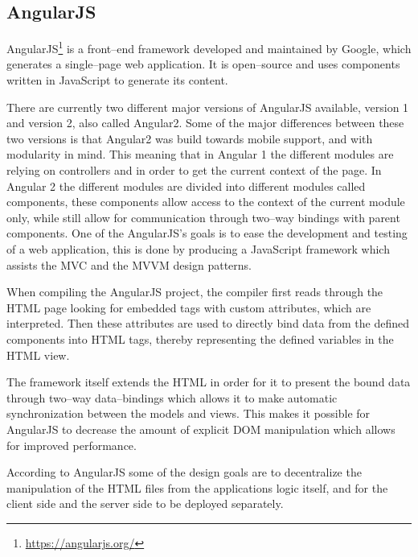 \subsection{AngularJS} \label{ssec:angular}
AngularJS\footnote{\url{https://angularjs.org/}} is a front--end framework developed and maintained by Google, which generates a single--page web application.
It is open--source and uses components written in JavaScript to generate its content.

\bigskip
There are currently two different major versions of AngularJS available, version 1 and version 2, also called Angular2\cite{angular_1_2}.
Some of the major differences between these two versions is that Angular2 was build towards mobile support, and with modularity in mind.
This meaning that in Angular 1 the different modules are relying on controllers and  in order to get the current context of the page.
In Angular 2 the different modules are divided into different modules called components, these components allow access to the context of the current module only, while still allow for communication through two--way bindings with parent components.
One of the AngularJS's goals is to ease the development and testing of a web application, this is done by producing a JavaScript framework which assists the MVC and the MVVM design patterns.

\bigskip
When compiling the AngularJS project, the compiler first reads through the HTML page looking for embedded tags with custom attributes, which are interpreted.
Then these attributes are used to directly bind data from the defined components into HTML tags, thereby representing the defined variables in the HTML view.

The framework itself extends the HTML in order for it to present the bound data through two--way data--bindings which allows it to make automatic synchronization between the models and views.
This makes it possible for AngularJS to decrease the amount of explicit \ac{DOM} manipulation which allows for improved performance.

According to AngularJS some of the design goals are to decentralize the manipulation of the HTML files from the applications logic itself, and for the client side and the server side to be deployed separately.
